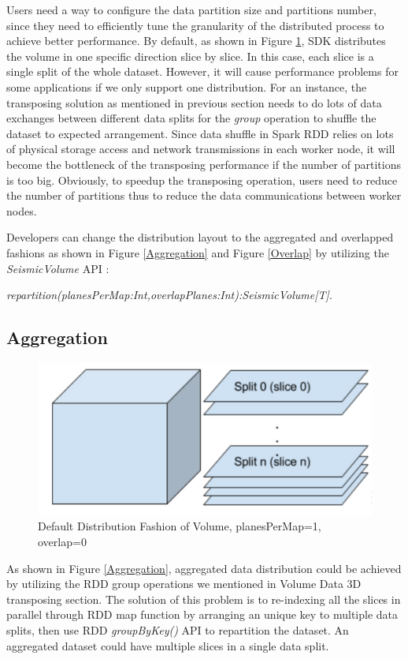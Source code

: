Users need a way to configure the data partition size and partitions number, since they need to efficiently tune the granularity of the distributed process to achieve better performance. By default, as shown in Figure \ref{DefDist}, SDK distributes the volume in one specific direction slice by slice. In this case, each slice is a single split of the whole dataset. However, it will cause performance problems for some applications if we only support one distribution. For an instance, the transposing solution as mentioned in previous section needs to do lots of data exchanges between different data splits for the \emph{group} operation to shuffle the dataset to expected arrangement. Since data shuffle in Spark RDD relies on lots of physical storage access and network transmissions in each worker node, it will become the bottleneck of the transposing performance if the number of partitions is too big. Obviously, to speedup the transposing operation, users need to reduce the number of partitions thus to reduce the data communications between worker nodes.

Developers can change the distribution layout to the aggregated and overlapped fashions as shown in Figure \ref{Aggregation} and Figure \ref{Overlap} by utilizing the \emph{SeismicVolume} API :

\emph{repartition(planesPerMap:Int,overlapPlanes:Int):SeismicVolume[T]}.


\subsection{Aggregation}

\begin{figure}[h]
\centering
\includegraphics[scale=0.6]{figures/DefDist.png}
\caption{Default Distribution Fashion of Volume, planesPerMap=1, overlap=0}
\label{DefDist}
\end{figure}

As shown in Figure \ref{Aggregation}, aggregated data distribution could be achieved by utilizing the RDD group operations we mentioned in Volume Data 3D transposing section. The solution of this problem is to re-indexing all the slices in parallel through RDD map function by arranging an unique key to multiple data splits, then use RDD \emph{groupByKey()} API to repartition the dataset. An aggregated dataset could have multiple slices in a single data split.

